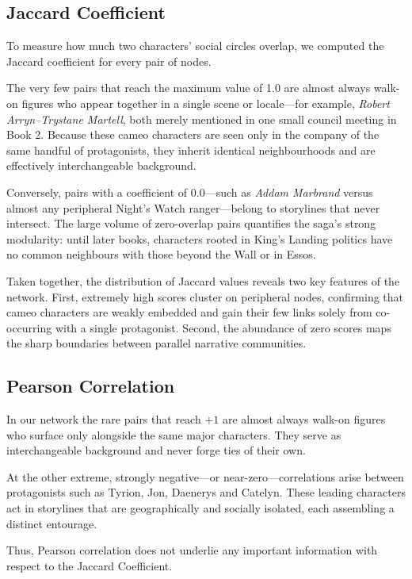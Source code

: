 \documentclass[12pt, a4paper]{article}
\begin{document}
	\subsection*{Jaccard Coefficient}
	
	To measure how much two characters' social circles overlap, we computed the
	Jaccard coefficient for every pair of nodes.
	
	The very few pairs that reach the maximum value of 1.0 are almost always
	walk-on figures who appear together in a single scene or locale—for example,
	\textit{Robert Arryn–Trystane Martell}, both merely mentioned in one small
	council meeting in Book 2.  Because these cameo characters are seen only in the
	company of the same handful of protagonists, they inherit identical
	neighbourhoods and are effectively interchangeable background.
	
	Conversely, pairs with a coefficient of 0.0—such as \textit{Addam Marbrand}
	versus almost any peripheral Night's Watch ranger—belong to storylines that
	never intersect.  The large volume of zero-overlap pairs quantifies the
	saga's strong modularity: until later books, characters rooted in King's
	Landing politics have no common neighbours with those beyond the Wall or in
	Essos.
	
	Taken together, the distribution of Jaccard values reveals two key features
	of the network.  First, extremely high scores cluster on peripheral nodes,
	confirming that cameo characters are weakly embedded and gain their few links
	solely from co-occurring with a single protagonist.  Second, the abundance of
	zero scores maps the sharp boundaries between parallel narrative communities.
	
	\subsection*{Pearson Correlation}
	
	In our network the rare pairs that reach \(+1\) are almost always
	walk-on figures who surface only alongside the same major characters.  
	They serve as interchangeable background and never forge ties of their own.
	
	At the other extreme, strongly negative—or near-zero—correlations arise
	between protagonists such as Tyrion, Jon, Daenerys and Catelyn.
	These leading characters act in storylines that are geographically and
	socially isolated, each assembling a distinct entourage.
	
	Thus, Pearson correlation does not underlie any important information with respect to the Jaccard Coefficient.
	
\end{document}
